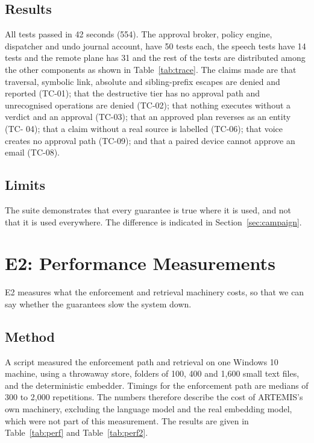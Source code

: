\documentclass{FastFyp}
\begin{document}
\subsection{Results}
All tests passed in 42 seconds (554). The approval broker, policy engine, dispatcher and undo journal account, have 50 tests each, the speech tests have 14 tests and the remote plane has 31 and the rest of the tests are distributed among the other components as shown in Table~\ref{tab:trace}. The claims made are that traversal, symbolic link, absolute and sibling-prefix escapes are denied and reported (TC-01); that the destructive tier has no approval path and unrecognised operations are denied (TC-02); that nothing executes without a verdict and an approval (TC-03); that an approved plan reverses as an entity (TC- 04); that a claim without a real source is labelled (TC-06); that voice creates no approval path (TC-09); and that a paired device cannot approve an email (TC-08).

\subsection{Limits}
The suite demonstrates that every guarantee is true where it is used, and not that it is used everywhere. The difference is indicated in Section~\ref{sec:campaign}.


\section{E2: Performance Measurements}
E2 measures what the enforcement and retrieval machinery costs, so that we can say whether the guarantees slow the system down.

\subsection{Method}
A script measured the enforcement path and retrieval on one Windows 10 machine, using a throwaway store, folders of 100, 400 and 1,600 small text files, and the deterministic embedder. Timings for the enforcement path are medians of 300 to 2,000 repetitions. The numbers therefore describe the cost of ARTEMIS's own machinery, excluding the language model and the real embedding model, which were not part of this measurement. The results are given in Table~\ref{tab:perf} and Table~\ref{tab:perf2}.
\end{document}
